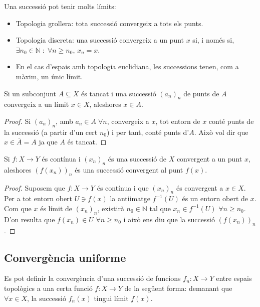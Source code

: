 \documentclass[../main.tex]{subfiles}
\begin{document}
\begin{ej}
\label{ej:successioconvergentespaitopo} Una successió pot tenir molts límits:
\begin{itemize}
    \item Topologia grollera: tota successió convergeix a tots els punts.
    \item Topologia discreta: una successió convergeix a un punt $x$ si, i només si, $\exists n_0\in\mathbb{N}\;:\;\forall n\geq n_0$, $x_n = x$.
    \item En el cas d'espais amb topologia euclidiana, les successions tenen, com a màxim, un únic límit.
\end{itemize}
\end{ej}

\begin{prop}
\label{prop:succonvergentaxena} Si un subconjunt $A\subseteq X$ és tancat i una successió $(a_n)_n$ de punts de $A$ convergeix a un límit $x\in X$, aleshores $x\in A$.
\end{prop}
\begin{proof}
Si $(a_n)_n$, amb $a_n\in A\;\forall n$, convergeix a $x$, tot entorn de $x$ conté punts de la successió (a partir d'un cert $n_0$) i per tant, conté punts d'$A$. Això vol dir que $x\in\overline{A} = A$ ja que $A$ és tancat.
\end{proof}

\begin{prop}
\label{prop:funciocontinuasuccessioconvergent} Si $f:X\rightarrow Y$ és contínua i $(x_n)_n$ és una successió de $X$ convergent a un punt $x$, aleshores $(f(x_n))_n$ és una successió convergent al punt $f(x)$.
\end{prop}
\begin{proof}
Suposem que $f:X\rightarrow Y$ és contínua i que $(x_n)_n$ és convergent a $x\in X$. Per a tot entorn obert $U\ni f(x)$ la antiimatge $f^{-1}(U)$ és un entorn obert de $x$. Com que $x$ és límit de $(x_n)_n$, existirà $n_0\in\mathbb{N}$ tal que $x_n\in f^{-1}(U)$ $\forall n\geq n_0$. D'on resulta que $f(x_n)\in U$ $\forall n\geq n_0$ i això ens diu que la successió $(f(x_n))_n$.
\end{proof}














\subsection{Convergència uniforme}
\begin{defi}
\label{defi:convergenciadefuncions} Es pot definir la convergència d'una successió de funcions $f_n:X\rightarrow Y$ entre espais topològics a una certa funció $f:X\rightarrow Y$ de la següent forma: demanant que $\forall x\in X$, la successió $f_n(x)$ tingui límit $f(x)$.
\end{defi}
\end{document}
